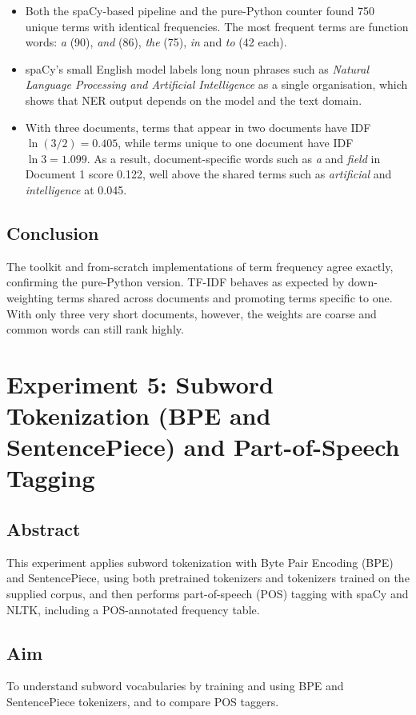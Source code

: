 \documentclass[12pt,a4paper,oneside]{report}
\providecommand{\tightlist}{\setlength{\itemsep}{0pt}\setlength{\parskip}{0pt}}
\begin{document}
\begin{itemize}
\tightlist
\item
  Both the spaCy-based pipeline and the pure-Python counter found 750 unique terms with identical frequencies. The most frequent terms are function words: \emph{a} (90), \emph{and} (86), \emph{the} (75), \emph{in} and \emph{to} (42 each).
\item
  spaCy's small English model labels long noun phrases such as \emph{Natural Language Processing and Artificial Intelligence} as a single organisation, which shows that NER output depends on the model and the text domain.
\item
  With three documents, terms that appear in two documents have IDF \(\ln(3/2)=0.405\), while terms unique to one document have IDF \(\ln 3=1.099\). As a result, document-specific words such as \emph{a} and \emph{field} in Document 1 score 0.122, well above the shared terms such as \emph{artificial} and \emph{intelligence} at 0.045.
\end{itemize}


\section{Conclusion}
The toolkit and from-scratch implementations of term frequency agree exactly, confirming the pure-Python version. TF-IDF behaves as expected by down-weighting terms shared across documents and promoting terms specific to one. With only three very short documents, however, the weights are coarse and common words can still rank highly.


\chapter{Experiment 5: Subword Tokenization (BPE and SentencePiece) and Part-of-Speech Tagging}
\section{Abstract}
This experiment applies subword tokenization with Byte Pair Encoding (BPE) and SentencePiece, using both pretrained tokenizers and tokenizers trained on the supplied corpus, and then performs part-of-speech (POS) tagging with spaCy and NLTK, including a POS-annotated frequency table.


\section{Aim}
To understand subword vocabularies by training and using BPE and SentencePiece tokenizers, and to compare POS taggers.
\end{document}
